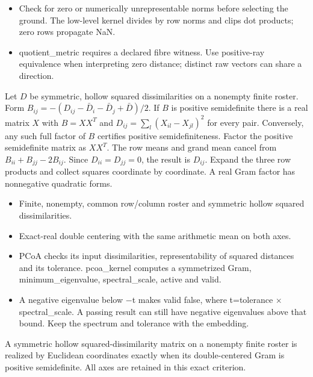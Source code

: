 \expandafter\def\csname statadic@diagnostics@STATADIC-GROUND-001\endcsname{\begin{itemize}
\item Check for zero or numerically unrepresentable norms before selecting the ground. The low-level kernel divides by row norms and clips dot products; zero rows propagate NaN.
\item quotient\_metric requires a declared fibre witness. Use positive-ray equivalence when interpreting zero distance; distinct raw vectors can share a direction.
\end{itemize}}
\expandafter\def\csname statadic@statement@STATADIC-EMBEDDING-001\endcsname{Let $D$ be symmetric, hollow squared dissimilarities on a nonempty
  finite roster. Form $B_{ij}=-(D_{ij}-\bar D_i-\bar D_j+\bar D)/2$.
  If $B$ is positive semidefinite there is a real matrix $X$ with $B=XX^T$ and
  $D_{ij}=\sum_l (X_{il}-X_{jl})^2$ for every pair. Conversely, any such full
  factor of $B$ certifies positive semidefiniteness.}
\expandafter\def\csname statadic@proof@STATADIC-EMBEDDING-001\endcsname{Factor the positive semidefinite matrix as $XX^T$.
  The row means and grand mean cancel from $B_{ii}+B_{jj}-2B_{ij}$.
  Since $D_{ii}=D_{jj}=0$, the result is $D_{ij}$. Expand the three row
  products and collect squares coordinate by coordinate. A real Gram factor has
  nonnegative quadratic forms.}
\expandafter\def\csname statadic@assumptions@STATADIC-EMBEDDING-001\endcsname{\begin{itemize}
\item Finite, nonempty, common row/column roster and symmetric hollow squared dissimilarities.
\item Exact-real double centering with the same arithmetic mean on both axes.
\end{itemize}}
\expandafter\def\csname statadic@diagnostics@STATADIC-EMBEDDING-001\endcsname{\begin{itemize}
\item PCoA checks its input dissimilarities, representability of squared distances and its tolerance. pcoa\_kernel computes a symmetrized Gram, minimum\_eigenvalue, spectral\_scale, active and valid.
\item A negative eigenvalue below \ensuremath{-}t makes valid false, where t=tolerance \ensuremath{\times} spectral\_scale. A passing result can still have negative eigenvalues above that bound. Keep the spectrum and tolerance with the embedding.
\end{itemize}}
\expandafter\def\csname statadic@statement@STATADIC-EMBEDDING-002\endcsname{A symmetric hollow squared-dissimilarity matrix on a nonempty finite
  roster is realized by Euclidean coordinates exactly when its double-centered Gram is
  positive semidefinite. All axes are retained in this exact criterion.}
